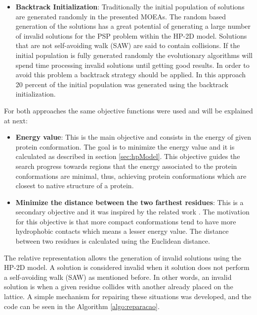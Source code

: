 \begin{itemize}
\begin{itemize}
	\end{itemize}

	
	\item \textbf{Backtrack Initialization}: Traditionally the initial population of solutions are generated randomly in the presented MOEAs. The random based generation of the solutions has a great potential of generating a large number of invalid solutions for the PSP problem within the HP-2D model. Solutions that are not self-avoiding walk (SAW) are said to contain collisions. If the initial population is fully generated randomly the evolutionary algorithms will spend time processing invalid solutions until getting good results. In order to avoid this problem a backtrack strategy should be applied. In this approach 20 percent of the initial population was generated using the backtrack initialization.
	
\end{itemize}


For both approaches the same objective functions were used and will be explained  at next:


\begin{itemize}
	\item \textbf{Energy value}: This is the main objective and consists in the energy of given protein conformation.  The goal is to minimize the energy value and it is calculated as described in section \ref{sec:hpModel}. This objective guides the search progress towards regions that the energy associated to the protein conformations are minimal, thus, achieving protein conformations which are closest to native structure of a protein.
	\item \textbf{Minimize the distance between the two farthest residues}: This is a secondary objective and it was inspired by the related work \cite{gabriel2012algoritmos}. The motivation for this objective is that more compact conformations tend to have more hydrophobic contacts which means a lesser energy value. The distance between two residues is calculated using the Euclidean distance.
\end{itemize}


The relative representation allows the generation of invalid solutions using the HP-2D model. A solution is considered invalid when it solution does not perform a self-avoiding walk (SAW) as mentioned before. In other words, an invalid solution is when a given residue collides with another already placed on the lattice. A simple mechanism for repairing these situations was developed, and the code can be seen in the Algorithm \ref{algo:reparacao}.


